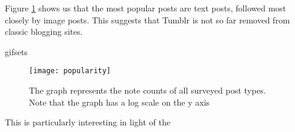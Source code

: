 Figure \ref{fig:-pop} shows us that the most popular posts are text 
posts, followed most closely by image posts.  This suggests that Tumblr 
is not so far removed from classic blogging sites.


gifsets\cite{hillman2014tumblr}

\begin{figure}[bht]
\centering
 \texttt{[image: popularity]}
  \caption{The graph represents the note counts of all surveyed post types.  Note that the graph has a log scale on the y axis}
  \label{fig:-pop}
\end{figure}
This is particularly interesting in light of the 

